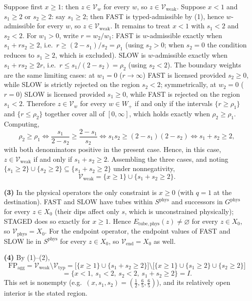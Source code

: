 \documentclass[review,11pt]{elsarticle}
\begin{document}
Suppose first \(x \ge 1\): then \(z \in \mathcal{V}_w\) for every \(w\),
so \(z \in \mathcal{V}_{\mathrm{weak}}\). Suppose \(x < 1\) and
\(s_1 \ge 2\) or \(s_2 \ge 2\): say \(s_1 \ge 2\); then FAST is
typed-admissible by (1), hence \(w\)-admissible for every \(w\), so
\(z \in \mathcal{V}_{\mathrm{weak}}\). It remains to treat \(x < 1\)
with \(s_1 < 2\) and \(s_2 < 2\). For \(w_1 > 0\), write
\(r = w_2/w_1\): FAST is \(w\)-admissible exactly when
\(s_1 + r s_2 \ge 2\), i.e.~\(r \ge (2 - s_1)/s_2 = \rho_1\) (using
\(s_2 > 0\); when \(s_2 = 0\) the condition reduces to \(s_1 \ge 2\),
which is excluded). SLOW is \(w\)-admissible exactly when
\(s_1 + r s_2 \ge 2r\), i.e.~\(r \le s_1/(2 - s_2) = \rho_2\) (using
\(s_2 < 2\)). The boundary weights are the same limiting cases: at
\(w_1 = 0\) (\(r \to \infty\)) FAST is licensed provided \(s_2 \ge 0\),
while SLOW is strictly rejected on the region \(s_2 < 2\);
symmetrically, at \(w_2 = 0\) (\(r = 0\)) SLOW is licensed provided
\(s_1 \ge 0\), while FAST is rejected on the region \(s_1 < 2\).
Therefore \(z \in \mathcal{V}_w\) for every \(w \in W_+\) if and only if
the intervals \(\{r \ge \rho_1\}\) and \(\{r \le \rho_2\}\) together
cover all of \([0, \infty]\), which holds exactly when
\(\rho_2 \ge \rho_1\). Computing,
\[\rho_2 \ge \rho_1 \iff \frac{s_1}{2 - s_2} \ge \frac{2 - s_1}{s_2} \iff s_1 s_2 \ge (2 - s_1)(2 - s_2) \iff s_1 + s_2 \ge 2,\]
with both denominators positive in the present case. Hence, in this
case, \(z \in \mathcal{V}_{\mathrm{weak}}\) if and only if
\(s_1 + s_2 \ge 2\). Assembling the three cases, and noting
\(\{s_1 \ge 2\} \cup \{s_2 \ge 2\} \subseteq \{s_1 + s_2 \ge 2\}\) under
nonnegativity,
\[\mathcal{V}_{\mathrm{weak}} = \{ x \ge 1 \} \cup \{ s_1 + s_2 \ge 2 \}.\]

\textbf{(3)} In the physical operators the only constraint is
\(x \ge 0\) (with \(q = 1\) at the destination). FAST and SLOW have
tubes within \(S^{\mathrm{phys}}\) and successors in
\(G^{\mathrm{phys}}\) for every \(z \in X_0\) (their dips affect only
\(s\), which is unconstrained physically); STAGED does so exactly for
\(x \ge 1\). Hence \(E_{\mathrm{tube,phys}}(z) \neq \varnothing\) for
every \(z \in X_0\), so \(\mathcal{V}_{\mathrm{phys}} = X_0\). For the
endpoint operator, the endpoint values of FAST and SLOW lie in
\(S^{\mathrm{phys}}\) for every \(z \in X_0\), so
\(\mathcal{V}_{\mathrm{end}} = X_0\) as well.

\textbf{(4)} By (1)--(2),
\[\mathrm{FP}_{\mathrm{agg}} = \mathcal{V}_{\mathrm{weak}} \setminus \mathcal{V}_{\mathrm{typ}}
= \big[ \{x \ge 1\} \cup \{s_1 + s_2 \ge 2\} \big] \setminus \big[ \{x \ge 1\} \cup \{s_1 \ge 2\} \cup \{s_2 \ge 2\} \big]\]
\[= \{ x < 1,\ s_1 < 2,\ s_2 < 2,\ s_1 + s_2 \ge 2 \} = I.\]
This set is nonempty
(e.g.~\((x, s_1, s_2) = (\tfrac12, \tfrac65, \tfrac65)\)), and its
relatively open interior is the stated region.
\end{document}
